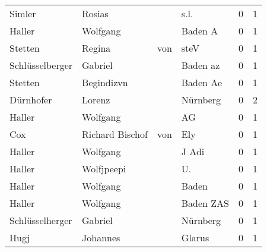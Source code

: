 \begin{tabular}{llllrr}
                   Simler &                             Rosias &             &                                        s.l. &          0 &         1 \\
                   Haller &                           Wolfgang &             &                                     Baden A &          0 &         1 \\
                  Stetten &                             Regina &         von &                                        steV &          0 &         1 \\
          Schlüsselberger &                            Gabriel &             &                                    Baden az &          0 &         1 \\
                  Stetten &                         Begindizvn &             &                                    Baden Ae &          0 &         1 \\
                Dürnhofer &                             Lorenz &             &                                    Nürnberg &          0 &         2 \\
                   Haller &                           Wolfgang &             &                                          AG &          0 &         1 \\
                      Cox &                    Richard Bischof &         von &                                         Ely &          0 &         1 \\
                   Haller &                           Wolfgang &             &                                       J Adi &          0 &         1 \\
                   Haller &                         Wolfjpeepi &             &                                         U.  &          0 &         1 \\
                   Haller &                           Wolfgang &             &                                       Baden &          0 &         1 \\
                   Haller &                           Wolfgang &             &                                   Baden ZAS &          0 &         1 \\
          Schlüsselherger &                            Gabriel &             &                                    Nürnberg &          0 &         1 \\
                     Hugj &                           Johannes &             &                                      Glarus &          0 &         1 \\

\end{tabular}
